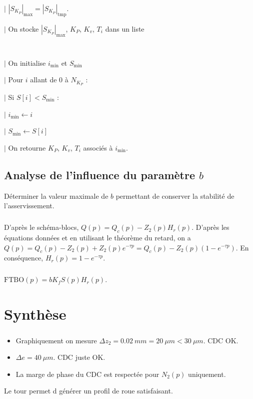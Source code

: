 \documentclass[10pt,fleqn]{article} %
\begin{document}
\noindent \hspace{1.6cm} $|$ $\left| S_{K_P} \right|_{\text{max}}= \left| S_{K_P} \right|_{\text{tmp}}$.

\noindent \hspace{.8cm} $|$ On stocke $\left| S_{K_P} \right|_{\text{max}}$, $K_P$, $K_v$, $T_i$ dans un liste
\subparagraph{}
~\\


\noindent \hspace{.4cm} $|$ On initialise $i_{\text{min}}$ et   $S_{\text{min}}$

\noindent \hspace{.4cm} $|$ Pour $i$ allant de 0 à $N_{K_P}$ :  

\noindent \hspace{.8cm} $|$ Si $S[i]<S_{\text{min}}$ :

\noindent \hspace{1.2cm} $|$ $i_{\text{min}}\leftarrow i$

\noindent \hspace{1.2cm} $|$ $S_{\text{min}}\leftarrow S[i]$

\noindent \hspace{.4cm} $|$ On retourne  $K_P$, $K_v$, $T_i$ associés à $i_{\text{min}}$.



\subsection{Analyse de l’influence du paramètre $b$}
\begin{obj}
Déterminer la valeur maximale de $b$ permettant de conserver la stabilité de l’asservissement.
\end{obj}



\subparagraph{}

D'après le schéma-blocs, $Q(p)=Q_c(p)-Z_2(p)H_r(p)$. 
D'après les équations données et en utilisant le théorème du retard, on a $Q(p)=Q_c(p)-Z_2(p)+Z_2(p)e^{-\tau p}=Q_c(p)-Z_2(p)\left(1-e^{-\tau p}\right)$. En conséquence, $H_r(p)=1-e^{-\tau p}$.


\subparagraph{}
$\text{FTBO}(p)=bK_f S(p)H_r(p)$.

\subparagraph{}

\section{Synthèse}

\subparagraph{}%
\begin{itemize}
\item Graphiquement on mesure $\Delta z_2 = \SI{0,02}{mm}=\SI{20}{\mu m}<\SI{30}{\mu m}$. CDC OK. 
\item $\Delta e = \SI{40}{\mu m}$. CDC juste OK. 
\item La marge de phase du CDC est respectée pour $N_2(p)$ uniquement. 
\end{itemize}

Le tour permet d générer un profil de roue satisfaisant. 
\end{document}
